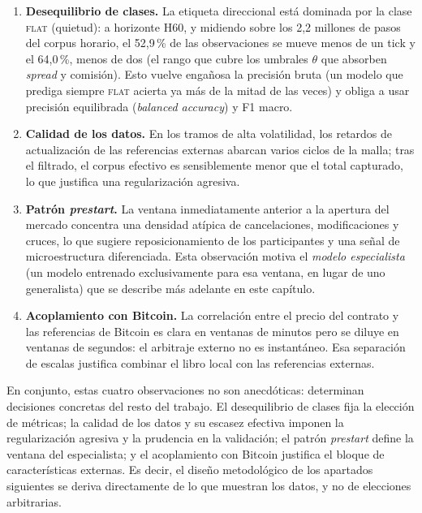 \begin{enumerate}[noitemsep]
  \item \textbf{Desequilibrio de clases.} La etiqueta direccional está dominada por la
  clase \textsc{flat} (quietud): a horizonte H60, y midiendo sobre los 2,2 millones de
  pasos del corpus horario, el 52,9\,\% de las observaciones se mueve menos de un tick y
  el 64,0\,\%, menos de dos (el rango que cubre los umbrales $\theta$ que absorben
  \emph{spread} y comisión). Esto vuelve engañosa la precisión bruta (un modelo que
  prediga siempre \textsc{flat} acierta ya más de la mitad de las veces) y obliga a usar
  precisión equilibrada (\emph{balanced accuracy}) y F1 macro.
  \item \textbf{Calidad de los datos.} En los tramos de alta volatilidad, los retardos de
  actualización de las referencias externas abarcan varios ciclos de la malla; tras el
  filtrado, el corpus efectivo es sensiblemente menor que el total capturado, lo que justifica
  una regularización agresiva.
  \item \textbf{Patrón \emph{prestart}.} La ventana inmediatamente anterior a la apertura
  del mercado concentra una densidad atípica de cancelaciones, modificaciones y cruces, lo
  que sugiere reposicionamiento de los participantes y una señal de microestructura
  diferenciada. Esta observación motiva el \emph{modelo especialista} (un modelo entrenado
exclusivamente para esa ventana, en lugar de uno generalista) que se describe más adelante
en este capítulo.
  \item \textbf{Acoplamiento con Bitcoin.} La correlación entre el precio del contrato y las
  referencias de Bitcoin es clara en ventanas de minutos pero se diluye en ventanas de
  segundos: el arbitraje externo no es instantáneo. Esa separación de escalas justifica
  combinar el libro local con las referencias externas.
\end{enumerate}

En conjunto, estas cuatro observaciones no son anecdóticas: determinan decisiones concretas
del resto del trabajo. El desequilibrio de clases fija la elección de métricas; la calidad de
los datos y su escasez efectiva imponen la regularización agresiva y la prudencia en la
validación; el patrón \emph{prestart} define la ventana del especialista; y el acoplamiento
con Bitcoin justifica el bloque de características externas. Es decir, el diseño metodológico
de los apartados siguientes se deriva directamente de lo que muestran los datos, y no de
elecciones arbitrarias.

